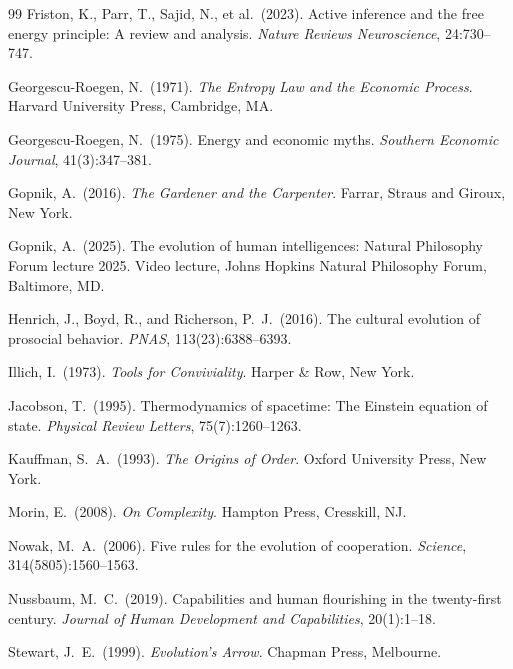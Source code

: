 \documentclass[12pt,a4paper]{article}
\theoremstyle{definition}
\begin{document}
\begin{thebibliography}{99}
Friston, K., Parr, T., Sajid, N., et al.\ (2023).
Active inference and the free energy principle: A review and analysis.
\textit{Nature Reviews Neuroscience}, 24:730--747.

Georgescu-Roegen, N.\ (1971).
\textit{The Entropy Law and the Economic Process}.
Harvard University Press, Cambridge, MA.

Georgescu-Roegen, N.\ (1975).
Energy and economic myths.
\textit{Southern Economic Journal}, 41(3):347--381.

Gopnik, A.\ (2016).
\textit{The Gardener and the Carpenter}.
Farrar, Straus and Giroux, New York.

Gopnik, A.\ (2025).
The evolution of human intelligences: Natural Philosophy Forum lecture 2025.
Video lecture, Johns Hopkins Natural Philosophy Forum, Baltimore, MD.

Henrich, J., Boyd, R., and Richerson, P.\ J.\ (2016).
The cultural evolution of prosocial behavior.
\textit{PNAS}, 113(23):6388--6393.

Illich, I.\ (1973).
\textit{Tools for Conviviality}.
Harper \& Row, New York.

Jacobson, T.\ (1995).
Thermodynamics of spacetime: The Einstein equation of state.
\textit{Physical Review Letters}, 75(7):1260--1263.

Kauffman, S.\ A.\ (1993).
\textit{The Origins of Order}.
Oxford University Press, New York.

Morin, E.\ (2008).
\textit{On Complexity}.
Hampton Press, Cresskill, NJ.

Nowak, M.\ A.\ (2006).
Five rules for the evolution of cooperation.
\textit{Science}, 314(5805):1560--1563.

Nussbaum, M.\ C.\ (2019).
Capabilities and human flourishing in the twenty-first century.
\textit{Journal of Human Development and Capabilities}, 20(1):1--18.

Stewart, J.\ E.\ (1999).
\textit{Evolution's Arrow}.
Chapman Press, Melbourne.

\end{thebibliography}
\end{document}

